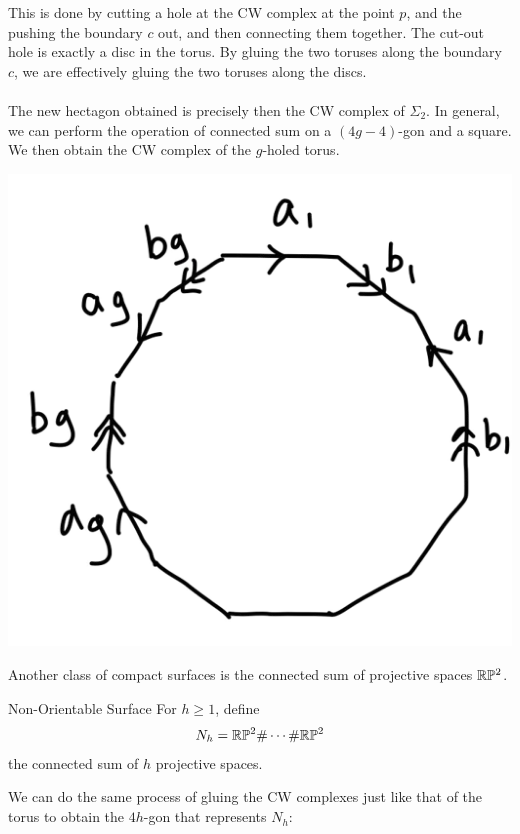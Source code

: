 \documentclass[a4paper]{article}
\begin{document}
This is done by cutting a hole at the CW complex at the point $p$, and the pushing the boundary $c$ out, and then connecting them together. The cut-out hole is exactly a disc in the torus. By gluing the two toruses along the boundary $c$, we are effectively gluing the two toruses along the discs. \\~\\

The new hectagon obtained is precisely then the CW complex of $\Sigma_2$. In general, we can perform the operation of connected sum on a $(4g-4)$-gon and a square. We then obtain the CW complex of the $g$-holed torus. 

\begin{center}
\includegraphics[scale = 0.3]{Image 2}
\end{center}

Another class of compact surfaces is the connected sum of projective spaces $\mathbb{R}\mathbb{P}^2$. 

\begin{defn}{Non-Orientable Surface}{} For $h\geq 1$, define $$N_h=\mathbb{R}\mathbb{P}^2\#\cdots\#\mathbb{R}\mathbb{P}^2$$ the connected sum of $h$ projective spaces. 
\end{defn}

We can do the same process of gluing the CW complexes just like that of the torus to obtain the $4h$-gon that represents $N_h$: 
\end{document}
